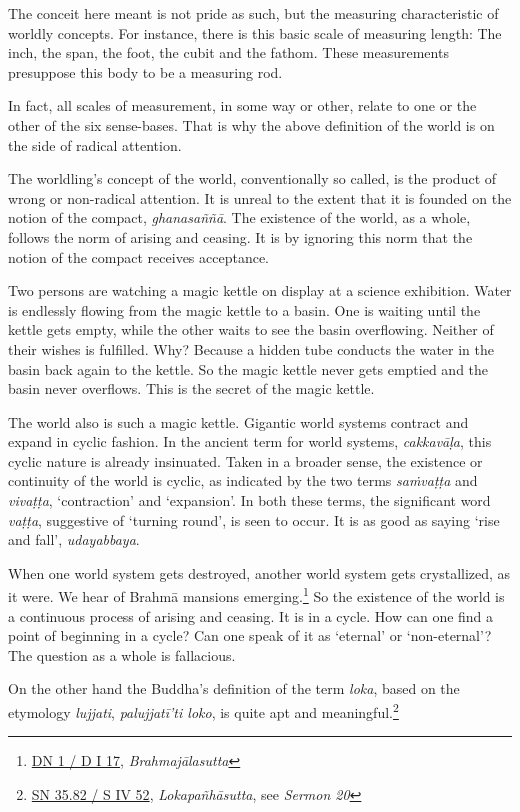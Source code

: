 The conceit here meant is not pride as such, but the measuring characteristic of worldly concepts. For instance, there is this basic scale of measuring length: The inch, the span, the foot, the cubit and the fathom. These measurements presuppose this body to be a measuring rod.

In fact, all scales of measurement, in some way or other, relate to one or the other of the six sense-bases. That is why the above definition of the world is on the side of radical attention.

The worldling's concept of the world, conventionally so called, is the product of wrong or non-radical attention. It is unreal to the extent that it is founded on the notion of the compact, \emph{ghanasaññā}. The existence of the world, as a whole, follows the norm of arising and ceasing. It is by ignoring this norm that the notion of the compact receives acceptance.

Two persons are watching a magic kettle on display at a science exhibition. Water is endlessly flowing from the magic kettle to a basin. One is waiting until the kettle gets empty, while the other waits to see the basin overflowing. Neither of their wishes is fulfilled. Why? Because a hidden tube conducts the water in the basin back again to the kettle. So the magic kettle never gets emptied and the basin never overflows. This is the secret of the magic kettle.

The world also is such a magic kettle. Gigantic world systems contract and expand in cyclic fashion. In the ancient term for world systems, \emph{cakkavāḷa}, this cyclic nature is already insinuated. Taken in a broader sense, the existence or continuity of the world is cyclic, as indicated by the two terms \emph{saṁvaṭṭa} and \emph{vivaṭṭa}, `contraction' and `expansion'. In both these terms, the significant word \emph{vaṭṭa}, suggestive of `turning round', is seen to occur. It is as good as saying `rise and fall', \emph{udayabbaya}.

When one world system gets destroyed, another world system gets crystallized, as it were. We hear of Brahmā mansions emerging.\footnote{\href{https://suttacentral.net/dn1/pli/ms}{DN 1 / D I 17}, \emph{Brahmajālasutta}} So the existence of the world is a continuous process of arising and ceasing. It is in a cycle. How can one find a point of beginning in a cycle? Can one speak of it as `eternal' or `non-eternal'? The question as a whole is fallacious.

On the other hand the Buddha's definition of the term \emph{loka}, based on the etymology \emph{lujjati}, \emph{palujjatī'ti loko}, is quite apt and meaningful.\footnote{\href{https://suttacentral.net/sn35.82/pli/ms}{SN 35.82 / S IV 52}, \emph{Lokapañhāsutta}, see \emph{Sermon 20}}

